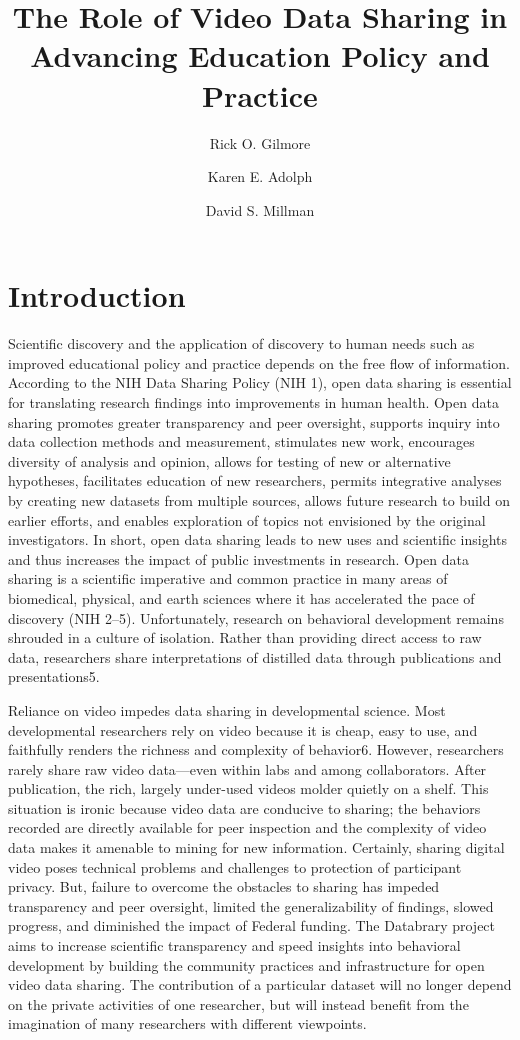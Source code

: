 \documentclass[letterpaper,man,natbib]{apa6}
\title{The Role of Video Data Sharing in Advancing Education Policy and Practice}
\author{Rick O. Gilmore}
\author{Karen E. Adolph}
\author{David S. Millman}
\affiliation{The Databrary (databrary.org) Project}
\begin{document}
\maketitle

\section{Introduction}
Scientific discovery and the application of discovery to human needs such as improved educational policy and practice depends on the free flow of information. 
According to the NIH Data Sharing Policy (NIH 1), open data sharing is essential for translating research findings into improvements in human health. 
Open data sharing promotes greater transparency and peer oversight, supports inquiry into data collection methods and measurement, stimulates new work, encourages diversity of analysis and opinion, allows for testing of new or alternative hypotheses, facilitates education of new researchers, permits integrative analyses by creating new datasets from multiple sources, allows future research to build on earlier efforts, and enables exploration of topics not envisioned by the original investigators. 
In short, open data sharing leads to new uses and scientific insights and thus increases the impact of public investments in research.
Open data sharing is a scientific imperative and common practice in many areas of biomedical, physical, and earth sciences where it has accelerated the pace of discovery (NIH 2–5). Unfortunately, research on behavioral development remains shrouded in a culture of isolation. 
Rather than providing direct access to raw data, researchers share interpretations of distilled data through publications and presentations5.

Reliance on video impedes data sharing in developmental science. 
Most developmental researchers rely on video because it is cheap, easy to use, and faithfully renders the richness and complexity of behavior6. 
However, researchers rarely share raw video data—even within labs and among collaborators. 
After publication, the rich, largely under-used videos molder quietly on a shelf. This situation is ironic because video data are conducive to sharing; the behaviors recorded are directly available for peer inspection and the complexity of video data makes it amenable to mining for new information. 
Certainly, sharing digital video poses technical problems and challenges to protection of participant privacy. But, failure to overcome the obstacles to sharing has impeded transparency and peer oversight, limited the generalizability of findings, slowed progress, and diminished the impact of Federal funding. The Databrary project aims to increase scientific transparency and speed insights into behavioral development by building the community practices and infrastructure for open video data sharing. 
The contribution of a particular dataset will no longer depend on the private activities of one researcher, but will instead benefit from the imagination of many researchers with different viewpoints.
\end{document}
